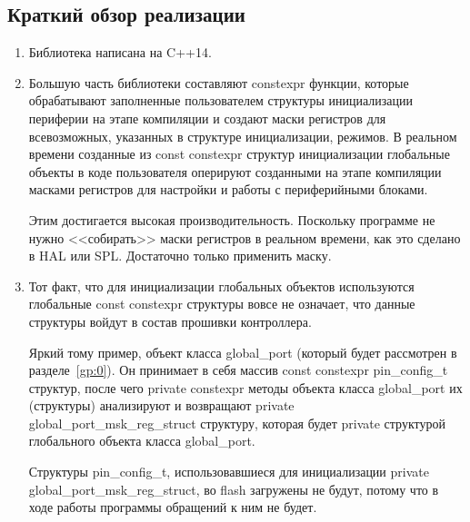\subsection{Краткий обзор реализации}
\begin{enumerate}
	\item Библиотека написана на C++14. 
	\item Большую часть библиотеки составляют constexpr функции, которые обрабатывают заполненные пользователем структуры инициализации периферии на этапе компиляции и создают маски регистров для всевозможных, указанных в структуре инициализации, режимов. В реальном времени созданные из const constexpr структур инициализации глобальные объекты в коде пользователя оперируют созданными на этапе компиляции масками регистров для настройки и работы с периферийными блоками.
	
	Этим достигается высокая производительность. Поскольку программе не нужно <<собирать>> маски регистров в реальном времени, как это сделано в HAL или SPL. Достаточно только применить маску.
	\item Тот факт, что для инициализации глобальных объектов используются глобальные const constexpr структуры вовсе не означает, что данные структуры войдут в состав прошивки контроллера.
	
	Яркий тому пример, объект класса global\_\-port (который будет рассмотрен в разделе~\ref{gp:0}). Он принимает в себя массив const constexpr pin\_config\_t структур, после чего private constexpr методы объекта класса global\_\-port их (структуры) анализируют и возвращают private global\_\-port\_\-msk\_\-reg\_\-struct структуру, которая будет private структурой глобального объекта класса global\_\-port.
	
	Структуры pin\_\-config\_\-t, использовавшиеся для инициализации private global\_\-port\_\-msk\_\-reg\_\-struct, во flash загружены не будут, потому что в ходе работы программы обращений к ним не будет.
\end{enumerate}

\label{gp:0}